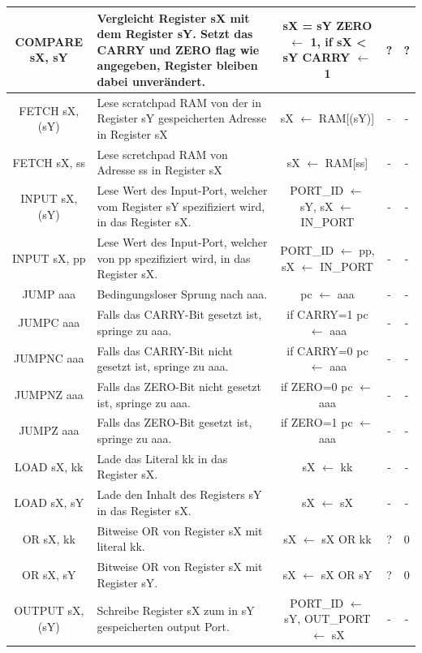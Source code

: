 \documentclass{scrartcl}
\begin{document}
\begin{longtable}{||c|p{4cm}|c|c|c||}
         COMPARE sX, sY & Vergleicht Register sX mit dem Register sY. Setzt das CARRY und ZERO flag wie angegeben, Register bleiben dabei unverändert. & \makecell{sX = sY ZERO $\leftarrow$ 1, \\ if sX \textless $ $ sY CARRY $\leftarrow$ 1  } & ? & ?  \\ \hline
         FETCH sX, (sY) & Lese scratchpad RAM von der in Register sY gespeicherten Adresse in Register sX &sX $\leftarrow$ RAM[(sY)] & - & -  \\ \hline
         FETCH sX, ss & Lese scretchpad RAM von Adresse ss in Register sX &sX $\leftarrow$ RAM[ss] & - & -  \\ \hline
         INPUT sX, (sY) & Lese Wert des Input-Port, welcher vom Register sY spezifiziert wird, in das Register sX. &PORT\_ID $\leftarrow$ sY, sX $\leftarrow$ IN\_PORT & - & -  \\ \hline
         INPUT sX, pp & Lese Wert des Input-Port, welcher von pp spezifiziert wird, in das Register sX. &PORT\_ID $\leftarrow$ pp, sX $\leftarrow$ IN\_PORT & - & -  \\ \hline
         JUMP aaa & Bedingungsloser Sprung nach aaa. &pc $\leftarrow$ aaa & - & -  \\ \hline
         JUMPC aaa & Falls das CARRY-Bit gesetzt ist, springe zu aaa. & if CARRY=1 pc $\leftarrow$ aaa & - & -  \\ \hline
         JUMPNC aaa & Falls das CARRY-Bit nicht gesetzt ist, springe zu aaa. &if CARRY=0 pc $\leftarrow$ aaa & - & -  \\ \hline
         JUMPNZ aaa & Falls das ZERO-Bit nicht gesetzt ist, springe zu aaa. &if ZERO=0 pc $\leftarrow$ aaa & - & -  \\ \hline
         JUMPZ aaa & Falls das ZERO-Bit gesetzt ist, springe zu aaa. &if ZERO=1 pc $\leftarrow$ aaa & - & -  \\ \hline 
         LOAD sX, kk & Lade das Literal kk in das Register sX. &sX $\leftarrow$ kk & - & -  \\ \hline
         LOAD sX, sY & Lade den Inhalt des Registers sY in das Register sX. &sX $\leftarrow$ sX & - & -  \\ \hline 
         OR sX, kk & Bitweise OR von Register sX mit literal kk. &sX $\leftarrow$ sX OR kk & ? & 0  \\ \hline
         OR sX, sY & Bitweise OR von Register sX mit Register sY. & sX $\leftarrow$ sX OR sY & ? & 0  \\ \hline
         OUTPUT sX, (sY) & Schreibe Register sX zum in sY gespeicherten output Port. &PORT\_ID $\leftarrow$ sY, OUT\_PORT $\leftarrow$ sX & - & -  \\ \hline

\end{longtable}
\end{document}
